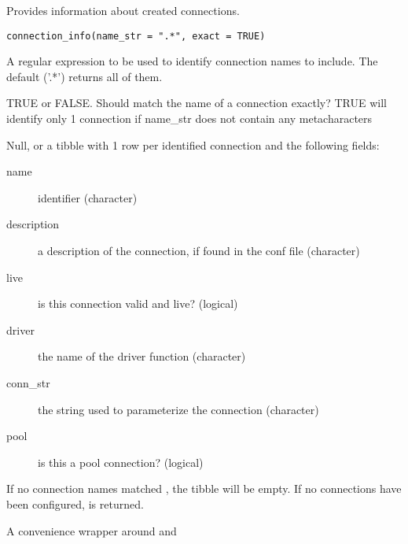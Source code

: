 \documentclass[a4paper]{book}
\begin{document}
%
\begin{Description}\relax
Provides information about created connections.
\end{Description}
%
\begin{Usage}
\begin{verbatim}
connection_info(name_str = ".*", exact = TRUE)
\end{verbatim}
\end{Usage}
%
\begin{Arguments}
\begin{ldescription}
\item[\code{name\_str}] A regular expression to be used to identify connection names
to include. The default ('.*') returns all of them.

\item[\code{exact}] TRUE or FALSE. Should  match the name of a connection
exactly? TRUE will identify only 1 connection if name\_str does not contain
any metacharacters
\end{ldescription}
\end{Arguments}
%
\begin{Value}
Null, or a tibble with 1 row per identified connection and the
following fields:

\begin{description}

\item[name] identifier (character)
\item[description] a description of the connection, if found in the conf file (character)
\item[live] is this connection valid and live? (logical)
\item[driver] the name of the driver function (character)
\item[conn\_str] the string used to parameterize the connection (character)
\item[pool] is this a pool connection? (logical)

\end{description}


If no connection names matched , the tibble will be empty. If
no connections have been configured,  is returned.
\end{Value}
%
\begin{Description}\relax
A convenience wrapper around  and 
\end{Description}
\end{document}
